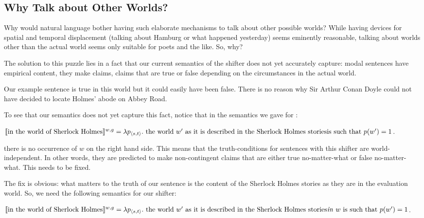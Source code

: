 \subsection{Why Talk about Other Worlds?} \label{sec:why-talk-about}

Why would natural language bother having such elaborate mechanisms to talk about
other possible worlds? While having devices for spatial and temporal
displacement (talking about Hamburg or what happened yesterday) seems eminently
reasonable, talking about worlds other than the actual world seems only suitable
for poets and the like. So, why?

The solution to this puzzle lies in a fact that our current semantics of the
shifter  does not yet accurately
capture: modal sentences have empirical content, they make 
claims, claims that are true or false depending on the circumstances in the
actual world.

Our example sentence  is true in this world but it could
easily have been false. There is no reason why Sir Arthur Conan Doyle could not
have decided to locate Holmes' abode on Abbey Road.

To see that our semantics does not yet capture this fact, notice that in the
semantics we gave for :

\ex $\llbracket \mbox{in the world of Sherlock Holmes} \rrbracket^{w,g} =\\
\lambda p_{\langle s,t \rangle}.\ \mbox{the world } w' \mbox{ as it is described in the Sherlock Holmes stories}\\
\mbox{is such that } p(w') = 1$.
\xe

there is no occurrence of $w$ on the right hand side. This means that the
truth-conditions for sentences with this shifter are world-independent. In other
words, they are predicted to make non-contingent claims that are either true
no-matter-what or false no-matter-what. This needs to be fixed.

The fix is obvious: what matters to the truth of our sentence is the content of
the Sherlock Holmes stories as they are in the evaluation world. So, we need the
following semantics for our shifter:

\ex $\llbracket \mbox{in the world of Sherlock Holmes} \rrbracket^{w,g} =\\
\lambda p_{\langle s,t \rangle}.\ \mbox{the world } w' \mbox{ as it is described in the Sherlock Holmes stories}\\
\mbox{\emph{in} } w \mbox{ is such that } p(w') = 1$. \xe

